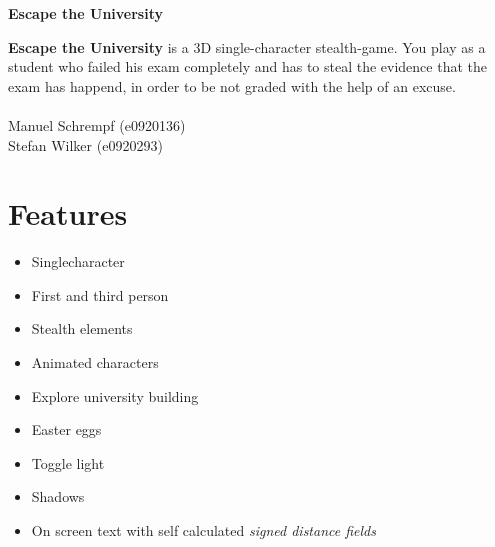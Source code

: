 \documentclass[12pt]{article}
\begin{document}
\newpage
\pagestyle{plain}
\setcounter{page}{1}

\textbf{\Huge Escape the University}\\

\begin{multicols}{2}
	\textbf{Escape the University} is a 3D single-character stealth-game.
	You play as a student who failed his exam completely and has to steal the evidence that the exam has happend, in order to be not graded with the help of an excuse. \\ \\
		Manuel Schrempf (e0920136)\\
		Stefan Wilker   (e0920293)

		\section*{Features}
		\begin{itemize}
			\item Singlecharacter
			\item First and third person
			\item Stealth elements
			\item Animated characters
			\item Explore university building
			\item Easter eggs
			\item Toggle light
			\item Shadows
			\item On screen text with self calculated \textit{signed distance fields}
		\end{itemize}
		\columnbreak


\end{multicols}
\end{document}
